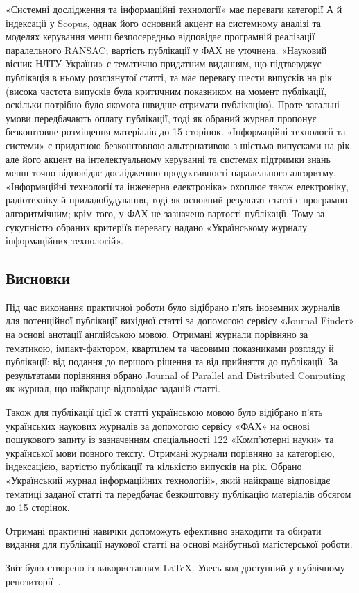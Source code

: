 \documentclass{article}
\begin{document}
«Системні дослідження та інформаційні технології» має переваги категорії А й індексації у Scopus, однак його основний акцент на системному аналізі та моделях керування менш безпосередньо відповідає програмній реалізації паралельного RANSAC; вартість публікації у ФАХ не уточнена. «Науковий вісник НЛТУ України» є тематично придатним виданням, що підтверджує публікація в ньому розглянутої статті, та має перевагу шести випусків на рік (висока частота випусків була критичним показником на момент публікації, оскільки потрібно було якомога швидше отримати публікацію). Проте загальні умови передбачають оплату публікації, тоді як обраний журнал пропонує безкоштовне розміщення матеріалів до 15 сторінок. «Інформаційні технології та системи» є придатною безкоштовною альтернативою з шістьма випусками на рік, але його акцент на інтелектуальному керуванні та системах підтримки знань менш точно відповідає дослідженню продуктивності паралельного алгоритму. «Інформаційні технології та інженерна електроніка» охоплює також електроніку, радіотехніку й приладобудування, тоді як основний результат статті є програмно-алгоритмічним; крім того, у ФАХ не зазначено вартості публікації. Тому за сукупністю обраних критеріїв перевагу надано «Українському журналу інформаційних технологій».

\endgroup
\subsection{Висновки}

Під час виконання практичної роботи було відібрано п'ять іноземних журналів для потенційної публікації вихідної статті за допомогою сервісу «Journal Finder» на основі анотації англійською мовою. Отримані журнали порівняно за тематикою, імпакт-фактором, квартилем та часовими показниками розгляду й публікації: від подання до першого рішення та від прийняття до публікації. За результатами порівняння обрано Journal of Parallel and Distributed Computing як журнал, що найкраще відповідає заданій статті.

Також для публікації цієї ж статті українською мовою було відібрано п'ять українських наукових журналів за допомогою сервісу «ФАХ» на основі пошукового запиту із зазначенням спеціальності 122 «Комп'ютерні науки» та української мови повного тексту. Отримані журнали порівняно за категорією, індексацією, вартістю публікації та кількістю випусків на рік. Обрано «Український журнал інформаційних технологій», який найкраще відповідає тематиці заданої статті та передбачає безкоштовну публікацію матеріалів обсягом до 15 сторінок.

Отримані практичні навички допоможуть ефективно знаходити та обирати видання для публікації наукової статті на основі майбутньої магістерської роботи.

Звіт було створено із використанням \LaTeX{}. Увесь код доступний у публічному репозиторії~\cite{github_science}.

\clearpage
\printbibliography[heading=bibintoc,title={СПИСОК ВИКОРИСТАНИХ ДЖЕРЕЛ}]
\end{document}
